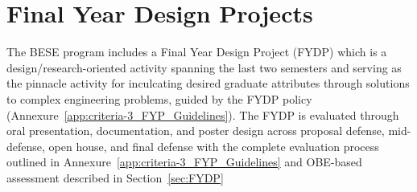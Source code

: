 \hypertarget{sec:4.11fydp}{%
\section{Final Year Design Projects}\label{sec:4.11fydp}}

The BESE program includes a Final Year Design Project (FYDP) which is a design/research-oriented activity spanning the last two semesters and serving as the pinnacle activity for inculcating desired graduate attributes through solutions to complex engineering problems, guided by the FYDP policy (Annexure~\ref{app:criteria-3_FYP_Guidelines}). The FYDP is evaluated through oral presentation, documentation, and poster design across proposal defense, mid-defense, open house, and final defense with the complete evaluation process outlined in Annexure~\ref{app:criteria-3_FYP_Guidelines} and OBE-based assessment described in Section~\ref{sec:FYDP}

